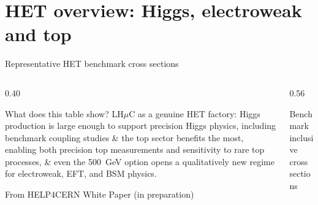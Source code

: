 \documentclass[aspectratio=1610,english]{beamer}
\begin{document}
\section{HET overview: Higgs, electroweak and top}



\begin{frame}{Representative HET benchmark cross sections}

\begin{columns}%
		
\begin{column}{0.40\textwidth}	
\begin{block}{What does this table show?}
\small
\justifying LH$\mu$C as a genuine HET factory:
Higgs production is large enough to support precision Higgs physics, including benchmark coupling studies {\color{red}\&} 
the top sector benefits the most, enabling both precision top measurements and sensitivity to rare top processes, {\color{red}\&}  
even the 500~GeV option opens a qualitatively new regime for electroweak, EFT, and BSM physics.
\end{block}
\centering
\tiny
{\setlength{\fboxsep}{4pt}\colorbox{yellow!40}{\strut From HELP4CERN White Paper (in preparation)}}
\end{column}



\begin{column}{0.56\textwidth}
			
{
				
\begin{block}{Benchmark inclusive cross sections}
\centering
\renewcommand{\arraystretch}{1.2}
\end{block}}
\end{column}
\end{columns}
\end{frame}
\end{document}
